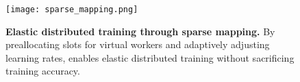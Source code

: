 \begin{figure}[t]
\centering
    \texttt{[image: sparse\_mapping.png]}
\caption{\textbf{Elastic distributed training through sparse mapping.} By preallocating slots for virtual workers and adaptively adjusting learning rates, \sysname enables elastic distributed training without sacrificing training accuracy.}
    \label{design:sparse}
\end{figure}

